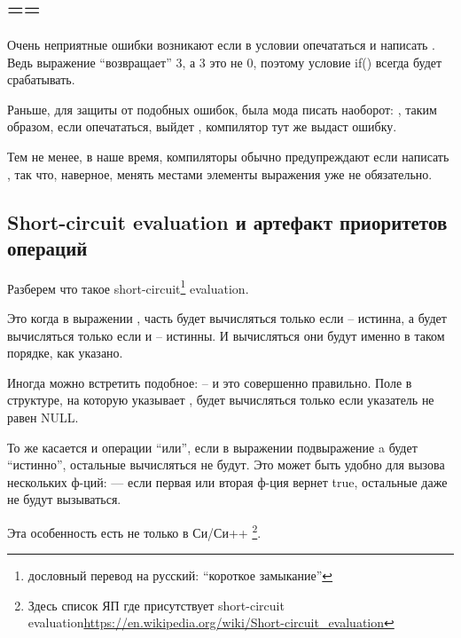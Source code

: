 ﻿\section{}

\subsection{==}

Очень неприятные ошибки возникают если в условии  опечататься и написать .
Ведь выражение  ``возвращает'' 3, а 3 это не 0, поэтому условие if() всегда будет 
срабатывать.

Раньше, для защиты от подобных ошибок, была мода писать наоборот: , таким образом,
если опечататься, выйдет , компилятор тут же выдаст ошибку.

Тем не менее, в наше время, компиляторы обычно предупреждают если написать , 
так что, наверное, менять местами элементы выражения уже не обязательно.

\subsection{Short-circuit evaluation и артефакт приоритетов операций}

Разберем что такое short-circuit\footnote{дословный перевод на русский: ``короткое замыкание''} evaluation.

Это когда в выражении , часть  будет вычисляться только если  -- истинна,
а  будет вычисляться
только если  и  -- истинны. И вычисляться они будут именно в таком порядке, как указано.

Иногда можно встретить подобное:  -- и это совершенно правильно.
Поле  в структуре,
на которую указывает , будет вычисляться только если указатель  не равен NULL.

То же касается и операции ``или'', если в выражении  подвыражение a будет ``истинно'',
остальные вычисляться не будут. Это может быть удобно для вызова нескольких ф-ций: 
 --- если первая или вторая ф-ция вернет true, 
остальные даже не будут вызываться.

Эта особенность есть не только в Си/Си++
\footnote{Здесь список ЯП где присутствует short-circuit evaluation\url{https://en.wikipedia.org/wiki/Short-circuit_evaluation}}.

